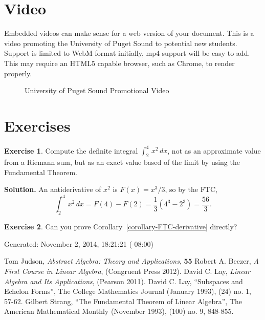\documentclass[10pt,]{article}
\theoremstyle{plain}
\theoremstyle{definition}
\newtheorem{exercise}{Exercise}
\newcommand{\definiteintegral}[4]{\int_{#1}^{#2}\,#3\,d#4}
\begin{document}
\section{Video}\label{section-9}
%
Embedded videos can make sense for a web version of your document. This is a video promoting the University of Puget Sound to potential new students.  Support is limited to WebM format initially, mp4 support will be easy to add.  This may require an HTML5 capable browser, such as Chrome, to render properly.
%
\begin{figure}[!htbp]
\centering
\caption{University of Puget Sound Promotional Video\label{figure-4}}
\end{figure}
%
\typeout{************************************************}
\typeout{************************************************}
%
\section{Exercises}\label{section-10}
%
\begin{exercise}\label{exercise-1}
Compute the definite integral $\definiteintegral{2}{4}{x^2}{x}$, not as an approximate value from a Riemann sum, but as an exact value based of the limit by using the Fundamental Theorem.
%
\par\smallskip\noindent\textbf{Solution.}\quad
An antiderivative of $x^2$ is $F(x)=x^3/3$, so by the FTC,\begin{displaymath}\definiteintegral{2}{4}{x^2}{x}=F(4)-F(2)=\frac{1}{3}\left(4^3-2^3\right)=\frac{56}{3}.\end{displaymath}
%
\end{exercise}
%
\begin{exercise}\label{exercise-2}
Can you prove Corollary~\cref{corollary-FTC-derivative} directly?
%
\end{exercise}
%
Generated: November 2, 2014, 18:21:21 (-08:00)
%
\begin{thebibliography}{99}
%
Tom Judson, \textit{Abstract Algebra: Theory and Applications}, \textbf{55}
%
Robert A. Beezer, \textsl{A First Course in Linear Algebra},  (Congruent Press 2012).
%
David C. Lay, \textsl{Linear Algebra and Its Applications},  (Pearson 2011).
%
David C. Lay, ``Subspaces and Echelon Forms'', The College Mathematics Journal (January 1993),  (24) no. 1, 57-62.
%
Gilbert Strang, ``The Fundamental Theorem of Linear Algebra'', The American Mathematical Monthly (November 1993),  (100) no. 9, 848-855.
%
\end{thebibliography}
%
\end{document}
